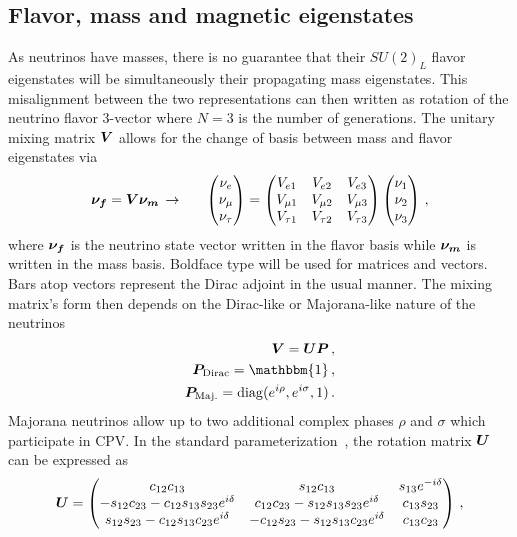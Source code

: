 \subsection{Flavor, mass and magnetic eigenstates}\label{sec:mix}
\noindent As neutrinos have masses, there is no guarantee that their $SU(2)_{L}$ flavor eigenstates will be simultaneously their propagating mass eigenstates. This misalignment between the two representations can then written as rotation of the neutrino flavor 3-vector where $N=3$ is the number of generations. The unitary mixing matrix $\boldsymbol{V}$ allows for the change of basis between mass and flavor eigenstates via
\begin{alignat}{1}
	\label{basis:1} \bb{\nu_{f}}=\bb{V}\bb{\nu_{m}}\,\rightarrow\indent
	\begin{pmatrix}
		\nu_{e}\\
		\nu_{\mu}\\
		\nu_{\tau}
	\end{pmatrix}=
	\begin{pmatrix}
		V_{e1} & V_{e2} & V_{e3}\\
		V_{\mu1} & V_{\mu2} & V_{\mu3}\\
		V_{\tau1} & V_{\tau2} & V_{\tau3}
	\end{pmatrix}
	\begin{pmatrix}
		\nu_{1}\\
		\nu_{2}\\
		\nu_{3}
	\end{pmatrix}\,,
\end{alignat}
where $\boldsymbol{\nu_{f}}$ is the neutrino state vector written in the flavor basis while $\boldsymbol{\nu_{m}}$ is written in the mass basis. Boldface type will be used for matrices and vectors. Bars atop vectors represent the Dirac adjoint in the usual manner. The mixing matrix's form then depends on the Dirac-like or Majorana-like nature of the neutrinos
\begin{align}
	\label{phases:1} \bb{V} = \bb{U}\bb{P}\,,\\
	\label{phases:2} \bb{P}_{\rm Dirac} = \mathbbm{1}\,,\\
	\label{phases:3} \bb{P}_{\rm Maj.} = {\rm diag}(e^{i\rho},e^{i\sigma},1)\,.
\end{align}
Majorana neutrinos allow up to two additional complex phases $\rho$ and $\sigma$ which participate in CPV. In the standard parameterization~\citep{Schwartz:2014sze}, the rotation matrix $\boldsymbol{U}$ can be expressed as
\begin{alignat}{1}
	\label{rotation:1} \boldsymbol{U} =
	  \begin{pmatrix}
		  c_{12}c_{13} & s_{12}c_{13} & s_{13}e^{-i\delta}\\
		  -s_{12}c_{23} - c_{12}s_{13}s_{23}e^{i\delta} & c_{12}c_{23} - s_{12}s_{13}s_{23}e^{i\delta} & c_{13}s_{23}\\
		  s_{12}s_{23} - c_{12}s_{13}c_{23}e^{i\delta}& -c_{12}s_{23} - s_{12}s_{13}c_{23}e^{i\delta} & c_{13}c_{23}
	  \end{pmatrix}\,,
\end{alignat}
